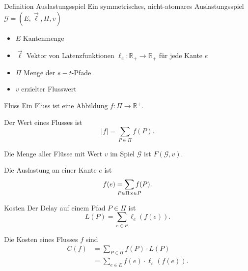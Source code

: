 \documentclass{beamer}
\begin{document}
\begin{frame}{Definition Auslastungsspiel}
	Ein symmetrisches, nicht-atomares \alert{Auslastungsspiel} $\mathcal G = (E, \vec{\ell}, \Pi, v)$
	\begin{itemize}
		\item $E$ Kantenmenge
		\item $\vec{\ell}$ Vektor von Latenzfunktionen $\ell_e : \mathbb R_+ \to \mathbb R_+$ für jede Kante $e$
		\item $\Pi$ Menge der $s-t$-Pfade
		\item $v$ erzielter Flusswert
	\end{itemize}
\end{frame}

\begin{frame}{Fluss}
	Ein \alert{Fluss} ist eine Abbildung $f: \Pi \to \mathbb R^+$. 
	
	Der \alert{Wert} eines Flusses ist \[ |{f}| = \sum_{P \in \Pi} f(P) . \]
	
	Die Menge aller Flüsse mit Wert $v$ im Spiel $\mathcal G$ ist $F(\mathcal G, v)$.
	
	Die Auslastung an einer Kante $e$ ist \[ f(e) = \sum_{\mathclap{P \in \Pi: e \in P}} f(P) . \]
\end{frame}

\begin{frame}{Kosten}
	Der \alert{Delay} auf einem Pfad $P \in \Pi$ ist
	\[ L(P) = \sum_{e \in P} \ell_e\left(f\left(e\right)\right). \]
	
	Die \alert{Kosten} eines Flusses $f$ sind
	\begin{align*}
		C(f) &= \sum_{P \in \Pi} f(P) \cdot L(P) \\
			&= \sum_{e \in E} f(e) \cdot \ell_e\left(f\left(e\right)\right). 
	\end{align*} 
\end{frame}
\end{document}
